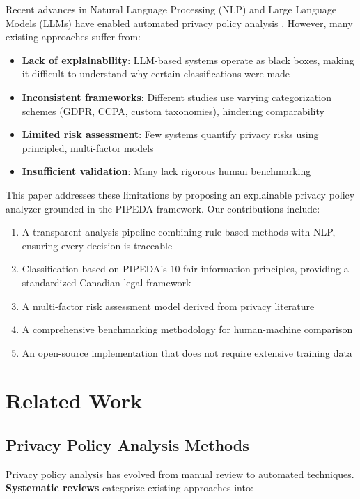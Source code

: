 \documentclass[conference]{IEEEtran}
\begin{document}
Recent advances in Natural Language Processing (NLP) and Large Language Models (LLMs) have enabled automated privacy policy analysis \cite{llm-assessment, clear}. However, many existing approaches suffer from:

\begin{itemize}
    \item \textbf{Lack of explainability}: LLM-based systems operate as black boxes, making it difficult to understand why certain classifications were made
    \item \textbf{Inconsistent frameworks}: Different studies use varying categorization schemes (GDPR, CCPA, custom taxonomies), hindering comparability
    \item \textbf{Limited risk assessment}: Few systems quantify privacy risks using principled, multi-factor models
    \item \textbf{Insufficient validation}: Many lack rigorous human benchmarking
\end{itemize}

This paper addresses these limitations by proposing an explainable privacy policy analyzer grounded in the PIPEDA framework. Our contributions include:

\begin{enumerate}
    \item A transparent analysis pipeline combining rule-based methods with NLP, ensuring every decision is traceable
    \item Classification based on PIPEDA's 10 fair information principles, providing a standardized Canadian legal framework
    \item A multi-factor risk assessment model derived from privacy literature
    \item A comprehensive benchmarking methodology for human-machine comparison
    \item An open-source implementation that does not require extensive training data
\end{enumerate}

\section{Related Work}

\subsection{Privacy Policy Analysis Methods}

Privacy policy analysis has evolved from manual review to automated techniques. \textbf{Systematic reviews} \cite{systematic-review} categorize existing approaches into:
\end{document}
